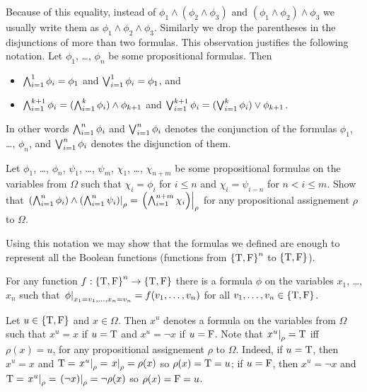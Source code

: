 Because of this equality, instead of $\phi_1 \land (\phi_2 \land \phi_3)$ and
$(\phi_1 \land \phi_2) \land \phi_3$ we usually write them
as $\phi_1 \land \phi_2 \land \phi_3$. Similarly we drop the
parentheses in the disjunctions of more than two formulas. This observation
justifies the following notation.
Let $\phi_1$, \dots, $\phi_n$ be some propositional formulas. Then
\begin{itemize}
  \item $\bigwedge_{i = 1}^1 \phi_i = \phi_1$ and
    $\bigvee_{i = 1}^1 \phi_i = \phi_1$, and
  \item $\bigwedge_{i = 1}^{k + 1} \phi_i =
    (\bigwedge_{i = 1}^{k} \phi_i) \land \phi_{k + 1}$ and
    $\bigvee_{i = 1}^{k + 1} \phi_i =
      (\bigvee_{i = 1}^{k} \phi_i) \lor \phi_{k + 1}$.
\end{itemize}
In other words $\bigwedge_{i = 1}^n \phi_i$ and $\bigvee_{i = 1}^n \phi_i$
denotes the conjunction of the formulas $\phi_1$, \dots, $\phi_n$, and
$\bigvee_{i = 1}^n \phi_i$ denotes the disjunction of them.

\begin{exercise}
  Let $\phi_1$, \dots, $\phi_n$, $\psi_1$, \dots, $\psi_m$, $\chi_1$, \dots,
  $\chi_{n + m}$ be some propositional formulas on the variables from $\Omega$
  such that $\chi_i = \phi_i$ for $i \le n$ and $\chi_i = \psi_{i - n}$ for
  $n < i \le m$. Show that
  $\left. {\left(\bigwedge_{i = 1}^n \phi_i\right) \land
    \left(\bigwedge_{i = 1}^n \psi_i\right)} \right\rvert_{\rho} =
  \left. {\left(\bigwedge_{i = 1}^{n + m} \chi_i\right)} \right\rvert_{\rho}$
  for any propositional assignement $\rho$ to $\Omega$.
\end{exercise}


Using this notation we may show that the formulas we defined are enough to
represent all the Boolean functions
(functions from $\set{\ltrue, \lfalse}^n$ to $\set{\ltrue, \lfalse}$).
\begin{theorem}
\label{theorem:function-to-formula}
  For any function $f : \set{\ltrue, \lfalse}^n \to
  \set{\ltrue, \lfalse}$ there is a
  formula $\phi$ on the variables $x_1$, \dots, $x_n$ such that
  $\left. {\phi} \right\rvert_{x_1 = v_1, \dots, x_n = v_n} = f(v_1, \dots, v_n)$ for all
  $v_1, \dots, v_n \in \set{\ltrue, \lfalse}$.
\end{theorem}

Let $u \in \set{\ltrue, \lfalse}$ and $x \in \Omega$. Then $x^u$ denotes a
formula on the variables from $\Omega$ such that $x^u = x$ if $u = \text{T}$ and
$x^u = \lnot x$ if $u = \text{F}$. Note that $\left. {x^u} \right\rvert_{\rho} = \text{T}$
iff $\rho(x) = u$, for any propositional assignement $\rho$ to $\Omega$.
Indeed, if $u = \text{T}$, then $x^u = x$ and
$\text{T} = \left. {x^u} \right\rvert_{\rho} = \left. {x} \right\rvert_{\rho} = \rho(x)$ so
$\rho(x) = \text{T} = u$;
if $u = \text{F}$, then $x^u = \lnot x$ and
$\text{T} = \left. {x^u} \right\rvert_{\rho} = \left. {\left(\lnot x\right)} \right\rvert_{\rho} =
\lnot \rho(x)$ so $\rho(x) = \text{F} = u$.

